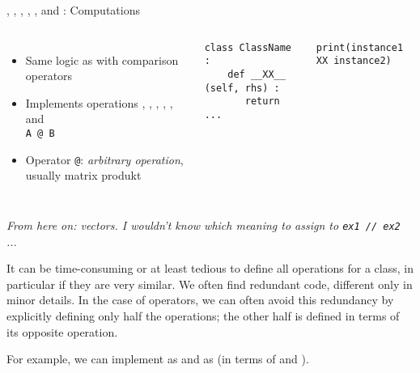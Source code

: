 
\begin{frame}[fragile]{, , , , ,  and : Computations}
%
\begin{columns}[T]
\begin{itemize}
\item Same logic as with comparison operators
\item Implements operations , , , , ,  and\\
 \texttt{A @ B}
\item Operator \texttt{@}: \emph{arbitrary operation}, usually matrix produkt
\end{itemize}
%
\begin{codebox}
\begin{verbatim}
class ClassName :
    def __XX__ (self, rhs) :
       return ...
\end{verbatim}
\end{codebox}
%
\begin{codebox}
\begin{verbatim}
print(instance1 XX instance2)
\end{verbatim}
\end{codebox}
\end{columns}
%
\vspace{6pt}
\emph{From here on: vectors. I wouldn't know which meaning to assign to \texttt{ex1 // ex2} ...}
%
\end{frame}


\begin{frame}
%
\begin{hintbox}
It can be time-consuming or at least tedious to define all operations for a class, in particular if they are very similar. We often find redundant code, different only in minor details. In the case of operators, we can often avoid this redundancy by explicitly defining only half the operations; the other half is defined in terms of its opposite operation.

For example, we can implement  as  and  as  (\ie in terms of  and ).
\end{hintbox}
%
\end{frame}

